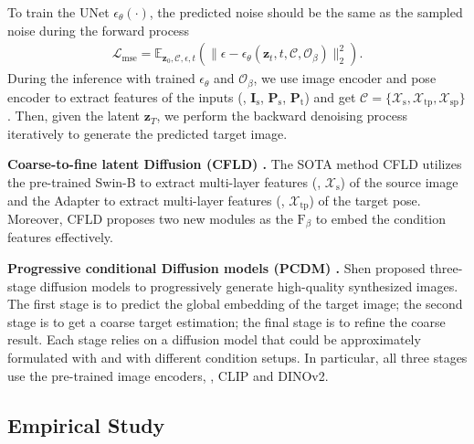 %
To train the UNet $\epsilon_\theta(\cdot)$, the predicted noise should be the same as the sampled noise during the forward process
%
\begin{align} \label{eq:loss_diffusion}
    \mathcal{L}_\text{mse} = \mathds{E}_{\mathbf{z}_0, \mathcal{C}, \epsilon, t}(\|\epsilon-\epsilon_\theta(\mathbf{z}_t, t, \mathcal{C},\mathcal{O}_\beta)\|^2_2).
\end{align}
%
During the inference with trained $\epsilon_\theta$ and $\mathcal{O}_\beta$, we use image encoder and pose encoder to extract features of the inputs (\ie, $\mathbf{I}_\text{s}$, $\mathbf{P}_\text{s}$, $\mathbf{P}_\text{t}$) and get $\mathcal{C} =\{\mathcal{X}_\text{s},\mathcal{X}_\text{tp},\mathcal{X}_\text{sp}\}$.
%
Then, given the latent $\mathbf{z}_T$, we perform the backward denoising process iteratively to generate the predicted target image. 

\textbf{Coarse-to-fine latent Diffusion (CFLD) \cite{lu2024coarse}.} 
%
The SOTA method CFLD \cite{lu2024coarse} utilizes the pre-trained Swin-B \cite{liu2021swin} to extract multi-layer features (\ie, $\mathcal{X}_\text{s}$) of the source image and the Adapter to extract multi-layer features \cite{mou2023t2i} (\ie, $\mathcal{X}_\text{tp}$) of the target pose. Moreover, CFLD proposes two new modules as the $\text{F}_\beta$ to embed the condition features effectively.

\textbf{Progressive conditional Diffusion models (PCDM) \cite{shen2024advancing}.} Shen \etal proposed three-stage diffusion models to progressively generate high-quality synthesized images. The first stage is to predict the global embedding of the target image; the second stage is to get a coarse target estimation; the final stage is to refine the coarse result. Each stage relies on a diffusion model that could be approximately formulated with  and  with different condition setups. In particular, all three stages use the pre-trained image encoders, \ie, CLIP and DINOv2.

\subsection{Empirical Study}
\label{sec:limitation}

